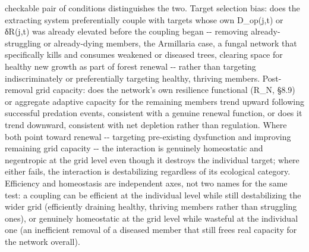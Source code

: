 \documentclass[
]{article}
\begin{document}
checkable pair of conditions distinguishes the two. Target selection
bias: does the extracting system preferentially couple with targets
whose own D\_op(j,t) or δR(j,t) was already elevated before the coupling
began -\/- removing already-struggling or already-dying members, the
Armillaria case, a fungal network that specifically kills and consumes
weakened or diseased trees, clearing space for healthy new growth as
part of forest renewal -\/- rather than targeting indiscriminately or
preferentially targeting healthy, thriving members. Post-removal grid
capacity: does the network's own resilience functional (R\_N, §8.9) or
aggregate adaptive capacity for the remaining members trend upward
following successful predation events, consistent with a genuine renewal
function, or does it trend downward, consistent with net depletion
rather than regulation. Where both point toward renewal -\/- targeting
pre-existing dysfunction and improving remaining grid capacity -\/- the
interaction is genuinely homeostatic and negentropic at the grid level
even though it destroys the individual target; where either fails, the
interaction is destabilizing regardless of its ecological category.
Efficiency and homeostasis are independent axes, not two names for the
same test: a coupling can be efficient at the individual level while
still destabilizing the wider grid (efficiently draining healthy,
thriving members rather than struggling ones), or genuinely homeostatic
at the grid level while wasteful at the individual one (an inefficient
removal of a diseased member that still frees real capacity for the
network overall).
\end{document}
